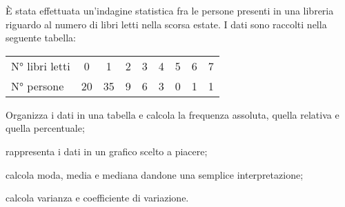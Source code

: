 \begin{esercizio}
\label{ese:A.38}
È stata effettuata un'indagine statistica fra le persone presenti in una libreria riguardo al numero di libri letti
nella scorsa estate. I dati sono raccolti nella seguente tabella:
\begin{center}
 \begin{tabular}{l*{8}{c}}
\toprule
N° libri letti & 0 & 1 & 2 & 3 & 4 & 5 & 6 & 7 \\
N° persone & 20 & 35 & 9 & 6 & 3 & 0 & 1 & 1 \\
\bottomrule
\end{tabular}
\end{center}
\begin{enumeratea}
 \item Organizza i dati in una tabella e calcola la frequenza assoluta, quella relativa e quella percentuale;
 \item rappresenta i dati in un grafico scelto a piacere;
 \item calcola moda, media e mediana dandone una semplice interpretazione;
 \item calcola varianza e coefficiente di variazione.
\end{enumeratea}
\end{esercizio}

